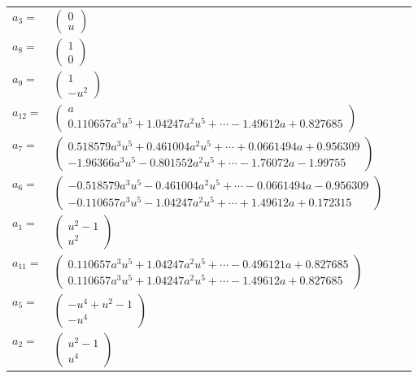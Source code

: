 \documentclass[1p]{elsarticle_modified}
\theoremstyle{definition}
\begin{document}
\begin{tabular}{m{7pt} m{180pt} m{7pt} m{180pt} }
\flushright $a_{3}=$&$\begin{pmatrix}0\\u\end{pmatrix}$ \\
\flushright $a_{8}=$&$\begin{pmatrix}1\\0\end{pmatrix}$ \\
\flushright $a_{9}=$&$\begin{pmatrix}1\\- u^2\end{pmatrix}$ \\
\flushright $a_{12}=$&$\begin{pmatrix}a\\0.110657 a^{3} u^{5}+1.04247 a^{2} u^{5}+\cdots-1.49612 a+0.827685\end{pmatrix}$ \\
\flushright $a_{7}=$&$\begin{pmatrix}0.518579 a^{3} u^{5}+0.461004 a^{2} u^{5}+\cdots+0.0661494 a+0.956309\\-1.96366 a^{3} u^{5}-0.801552 a^{2} u^{5}+\cdots-1.76072 a-1.99755\end{pmatrix}$ \\
\flushright $a_{6}=$&$\begin{pmatrix}-0.518579 a^{3} u^{5}-0.461004 a^{2} u^{5}+\cdots-0.0661494 a-0.956309\\-0.110657 a^{3} u^{5}-1.04247 a^{2} u^{5}+\cdots+1.49612 a+0.172315\end{pmatrix}$ \\
\flushright $a_{1}=$&$\begin{pmatrix}u^2-1\\u^2\end{pmatrix}$ \\
\flushright $a_{11}=$&$\begin{pmatrix}0.110657 a^{3} u^{5}+1.04247 a^{2} u^{5}+\cdots-0.496121 a+0.827685\\0.110657 a^{3} u^{5}+1.04247 a^{2} u^{5}+\cdots-1.49612 a+0.827685\end{pmatrix}$ \\
\flushright $a_{5}=$&$\begin{pmatrix}- u^4+u^2-1\\- u^4\end{pmatrix}$ \\
\flushright $a_{2}=$&$\begin{pmatrix}u^2-1\\u^4\end{pmatrix}$ \\

\end{tabular}
\end{document}
